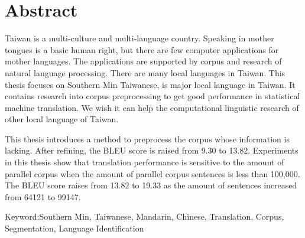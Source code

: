 \chapter{Abstract}
Taiwan is a multi-culture and multi-language country.
Speaking in mother tongues is a basic human right,
but there are few computer applications for mother languages.
The applications are supported by corpus and research of natural language processing.
There are many local languages in Taiwan.
This thesis focuses on Southern Min Taiwanese, is major local language in Taiwan.
It contains research into corpus preprocessing to get good performance in statistical machine translation.
We wish it can help the computational linguistic research of other local language of Taiwan.

This thesis introduces a method to preprocess the corpus whose information is lacking.
After refining,
the BLEU score is raised from 9.30 to 13.82.
Experiments in this thesis show that
translation performance is sensitive to the amount of parallel corpus
when the amount of parallel corpus sentences is less than 100,000.
The BLEU score raises from 13.82 to 19.33 as the amount of sentences increased from 64121 to 99147.

Keyword:Southern Min, Taiwanese, Mandarin, Chinese, Translation, Corpus, Segmentation, Language Identification